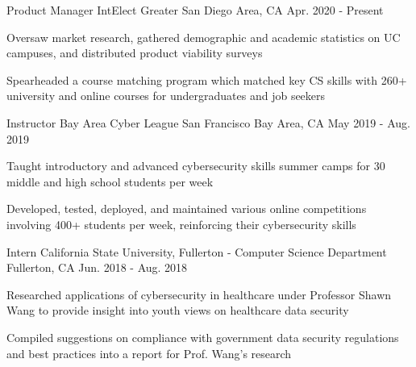 

\begin{cventries}

\cventry
{Product Manager} %
{IntElect} %
{Greater San Diego Area, CA} %
{Apr. 2020 - Present} %
{
  \begin{cvitems} %
    \item {Oversaw market research, gathered demographic and academic statistics on UC campuses, and distributed product viability surveys}
    \item {Spearheaded a course matching program which matched key CS skills with 260+ university and online courses for undergraduates and job seekers}
  \end{cvitems}
}

  \cventry
    {Instructor} %
    {Bay Area Cyber League} %
    {San Francisco Bay Area, CA} %
    {May 2019 - Aug. 2019} %
    {
      \begin{cvitems} %
        \item {Taught introductory and advanced cybersecurity skills summer camps for 30 middle and high school students per week}
        \item {Developed, tested, deployed, and maintained various online competitions involving 400+ students per week, reinforcing their cybersecurity skills}
      \end{cvitems}
    }

  \cventry
    {Intern} %
    {California State University, Fullerton - Computer Science Department} %
    {Fullerton, CA} %
    {Jun. 2018 - Aug. 2018} %
    {
      \begin{cvitems} %
        \item {Researched applications of cybersecurity in healthcare under Professor Shawn Wang to provide insight into youth views on healthcare data security}
        \item {Compiled suggestions on compliance with government data security regulations and best practices into a report for Prof. Wang's research}
      \end{cvitems}
    }

\end{cventries}
